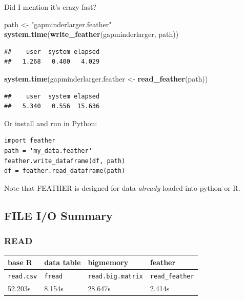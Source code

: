 \documentclass[]{article}
\newenvironment{Shaded}{\begin{snugshade}}{\end{snugshade}}
\newcommand{\KeywordTok}[1]{\textcolor[rgb]{0.13,0.29,0.53}{\textbf{{#1}}}}
\newcommand{\StringTok}[1]{\textcolor[rgb]{0.31,0.60,0.02}{{#1}}}
\newcommand{\NormalTok}[1]{{#1}}
\begin{document}
Did I mention it's crazy fast?

\begin{Shaded}
\begin{Highlighting}[]
\NormalTok{path <-}\StringTok{ "gapminderlarger.feather"}
\KeywordTok{system.time}\NormalTok{(}\KeywordTok{write_feather}\NormalTok{(gapminderlarger, path))}
\end{Highlighting}
\end{Shaded}

\begin{verbatim}
##    user  system elapsed 
##   1.268   0.400   4.029
\end{verbatim}

\begin{Shaded}
\begin{Highlighting}[]
\KeywordTok{system.time}\NormalTok{(gapminderlarger.feather <-}\StringTok{ }\KeywordTok{read_feather}\NormalTok{(path))}
\end{Highlighting}
\end{Shaded}

\begin{verbatim}
##    user  system elapsed 
##   5.340   0.556  15.636
\end{verbatim}

Or install and run in Python:

\begin{verbatim}
import feather
path = 'my_data.feather'
feather.write_dataframe(df, path)
df = feather.read_dataframe(path)
\end{verbatim}

Note that FEATHER is designed for data \emph{already} loaded into python
or R.

\subsection{FILE I/O Summary}\label{file-io-summary}

\subsubsection{READ}\label{read}

\begin{longtable}[c]{@{}llll@{}}
\toprule
\textbf{base R} & \textbf{data table} & \textbf{bigmemory} &
\textbf{feather}\tabularnewline
\midrule
\endhead
\texttt{read.csv} & \texttt{fread} & \texttt{read.big.matrix} &
\texttt{read\_feather}\tabularnewline
52.203s & 8.154s & 28.647s & 2.414s\tabularnewline
\bottomrule
\end{longtable}
\end{document}
